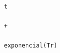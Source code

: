 \documentclass[10pt,a4paper]{article} %
\begin{document}
\begin{lstlisting}
                                                                                                                                                                                                                                                                                                                                                                                                                                                                                                                                                                                                                                                                                                                                                                                                                                                                                                                                                                                                                                t
                                                                                                                                                                                                                                                                                                                                                                                                                                                                                                                                                                                                                                                                                                                                                                                                                                                                                                                                                                                                                                +
                                                                                                                                                                                                                                                                                                                                                                                                                                                                                                                                                                                                                                                                                                                                                                                                                                                                                                                                                                                                                                exponencial(Tr)

\end{lstlisting}
\end{document}
